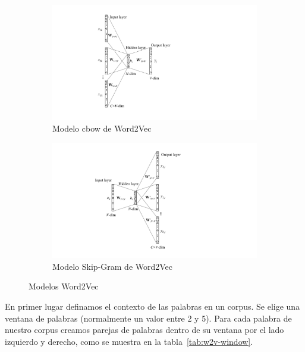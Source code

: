 \documentclass[withindex, glossary]{cam-thesis}
\begin{document}
\begin{figure}
    \centering
    \begin{subfigure}[t]{0.4\textwidth}
        \centering
        \includegraphics[width=\textwidth]{figures/fig-cbow.pdf}
        \caption{Modelo \acrshort{cbow} de Word2Vec\cite{DBLP:journals/corr/Rong14}}\label{cbow}
    \end{subfigure}
    \begin{subfigure}[t]{0.4\textwidth}
        \centering
        \includegraphics[width=\textwidth]{figures/fig-skip-gram.pdf}
        \caption{Modelo Skip-Gram de Word2Vec\cite{DBLP:journals/corr/Rong14}}\label{skip-gram}
    \end{subfigure}
    \caption{Modelos Word2Vec}
\end{figure}

En primer lugar definamos el contexto de las palabras en un corpus. Se elige una ventana de palabras (normalmente un valor entre 2 y 5). Para cada palabra de nuestro corpus creamos parejas de palabras dentro de su ventana por el lado izquierdo y derecho, como se muestra en la tabla~\ref{tab:w2v-window}.
\end{document}
